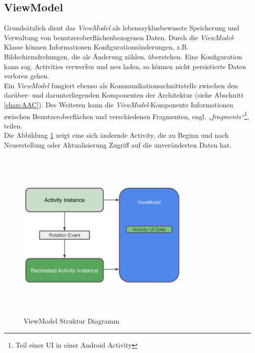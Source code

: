 \subsection*{ViewModel}
\label{sec:ViewModel}
Grundsätzlich dient das \textit{ViewModel} als lebenszyklusbewusste Speicherung und Verwaltung von benutzeroberflächenbezogenen Daten. 
Durch die \textit{ViewModel}-Klasse können Informationen Konfigurationsänderungen, z.B. Bildschirmdrehungen, die als Änderung zählen, 
überstehen. Eine Konfiguration kann sog. Activities verwerfen und neu laden, so können nicht persistierte Daten verloren gehen. \cite{viewModelAndroid.2020}
\\ 
\linebreak
Ein \textit{ViewModel} fungiert ebenso als Kommunikationsschnittstelle zwischen den darüber- und darunterliegenden Komponenten der 
Architektur (siehe Abschnitt \ref{chap:AAC}). Des Weiteren kann die \textit{ViewModel}-Komponente Informationen zwischen Benutzeroberflächen 
und verschiedenen Fragmenten, engl. \textit{„fragments“}\footnote{Teil einer \ac{UI} in einer Android Activity}, teilen.
\\ 
Die Abbildung \ref{pic:viewModeldiagramm} zeigt eine sich ändernde Activity, die zu Beginn und nach Neuerstellung oder Aktualisierung Zugriff 
auf die unveränderten Daten hat. 
\begin{figure}[hbt!]
    \centering
    \includegraphics[width=8.5cm,height=8.5cm,keepaspectratio]{2Grundlagen/Bilder/viewModelDiagram.png}
    \caption{ViewModel Struktur Diagramm \cite{viewmodeldiagr.2020}}
    \label{pic:viewModeldiagramm}
\end{figure} 
\pagebreak
